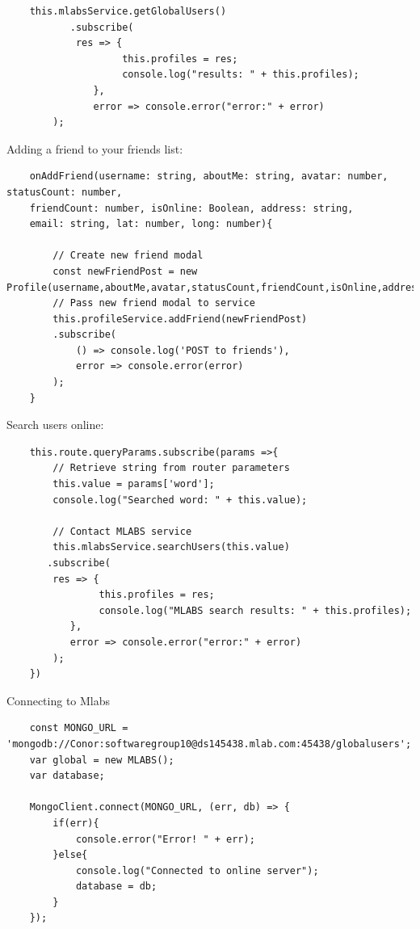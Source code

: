 \begin{lstlisting}
    this.mlabsService.getGlobalUsers()
           .subscribe(
            res => {
                    this.profiles = res;
                    console.log("results: " + this.profiles);
               },
               error => console.error("error:" + error)
        );
\end{lstlisting}
Adding a friend to your friends list:
\begin{lstlisting}
    onAddFriend(username: string, aboutMe: string, avatar: number, statusCount: number,
    friendCount: number, isOnline: Boolean, address: string,
    email: string, lat: number, long: number){

        // Create new friend modal
        const newFriendPost = new Profile(username,aboutMe,avatar,statusCount,friendCount,isOnline,address,email,lat,long);
        // Pass new friend modal to service
        this.profileService.addFriend(newFriendPost)
        .subscribe(
            () => console.log('POST to friends'),
            error => console.error(error)
        );
    }
\end{lstlisting}
Search users online:
\begin{lstlisting}
    this.route.queryParams.subscribe(params =>{
        // Retrieve string from router parameters
        this.value = params['word'];
        console.log("Searched word: " + this.value);

        // Contact MLABS service
        this.mlabsService.searchUsers(this.value)
       .subscribe(
        res => {
                this.profiles = res;
                console.log("MLABS search results: " + this.profiles);
           },
           error => console.error("error:" + error)
        );
    })
\end{lstlisting}
Connecting to Mlabs
\begin{lstlisting}
    const MONGO_URL = 'mongodb://Conor:softwaregroup10@ds145438.mlab.com:45438/globalusers';
    var global = new MLABS();
    var database;

    MongoClient.connect(MONGO_URL, (err, db) => {  
        if(err){
            console.error("Error! " + err);
        }else{
            console.log("Connected to online server");
            database = db;
        }
    });
\end{lstlisting}

